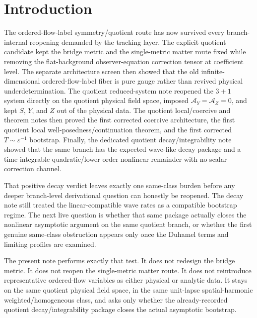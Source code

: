 \documentclass[11pt]{article}
\newcommand{\AY}{\mathcal A_Y}
\newcommand{\AZ}{\mathcal A_Z}
\begin{document}
\section{Introduction}

The ordered-flow-label symmetry/quotient route has now survived every branch-internal reopening demanded by the tracking layer. The explicit quotient candidate kept the bridge metric and the single-metric matter route fixed while removing the flat-background observer-equation correction tensor at coefficient level. The separate architecture screen then showed that the old infinite-dimensional ordered-flow-label fiber is pure gauge rather than revived physical underdetermination. The quotient reduced-system note reopened the \(3+1\) system directly on the quotient physical field space, imposed \(\AY=\AZ=0\), and kept \(S\), \(Y\), and \(Z\) out of the physical data. The quotient local/coercive and theorem notes then proved the first corrected coercive architecture, the first quotient local well-posedness/continuation theorem, and the first corrected \(T\sim\varepsilon^{-1}\) bootstrap. Finally, the dedicated quotient decay/integrability note showed that the same branch has the expected wave-like decay package and a time-integrable quadratic/lower-order nonlinear remainder with no scalar correction channel.

That positive decay verdict leaves exactly one same-class burden before any deeper branch-level derivational question can honestly be reopened. The decay note still treated the linear-compatible wave rates as a compatible bootstrap regime. The next live question is whether that same package actually closes the nonlinear asymptotic argument on the same quotient branch, or whether the first genuine same-class obstruction appears only once the Duhamel terms and limiting profiles are examined.

The present note performs exactly that test. It does not redesign the bridge metric. It does not reopen the single-metric matter route. It does not reintroduce representative ordered-flow variables as either physical or analytic data. It stays on the same quotient physical field space, in the same unit-lapse spatial-harmonic weighted/homogeneous class, and asks only whether the already-recorded quotient decay/integrability package closes the actual asymptotic bootstrap.
\end{document}
